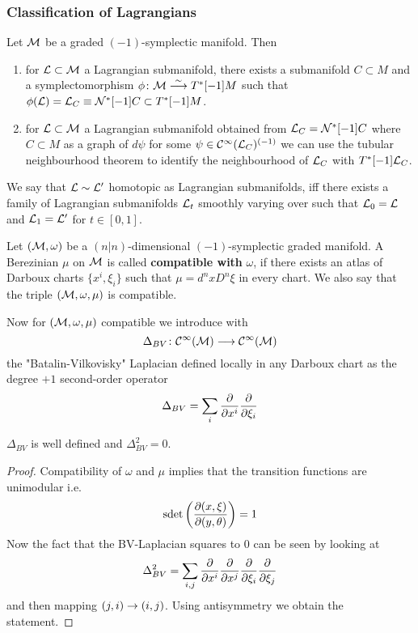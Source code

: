 \subsubsection{Classification of Lagrangians}

Let $\mathcal{M}$ be a graded $(-1)$-symplectic manifold. Then
\begin{enumerate}\label{Classfication_Lagrangian}
  \item for $\mathcal{L} \subset \mathcal{M}$ a Lagrangian submanifold, there exists a submanifold $C \subset M$ and a symplectomorphism $\phi \colon \MM \atob{\sim} T^*[-1]M$ such that $\phi(\LL) = \LL_C \equiv \NC^*[-1] C \subset T^*[-1]M$.

  \item for $\mathcal{L} \subset \mathcal{M}$ a Lagrangian submanifold obtained from $\mathcal{L}_C = \mathcal{N}^*[-1] C$ where $C \subset M$ as a graph of $d\psi$ for some $\psi \in \mathcal{C}^{\infty}(\mathcal{L}_C)^{(-1)}$ we can use the tubular neighbourhood theorem to identify the neighbourhood of $\mathcal{L}_C$ with $T^*[-1]\mathcal{L}_C$.
\end{enumerate}

We say that $\mathcal{L} \sim \mathcal{L}^\prime$ homotopic as Lagrangian submanifolds, iff there exists a family of Lagrangian submanifolds $\mathcal{L}_t$ smoothly varying over  such that $\mathcal{L}_0 = \mathcal{L}$ and $\mathcal{L}_1 = \mathcal{L}^\prime$ for $t \in [0,1]$.

\begin{definition}
  Let $(\mathcal{M}, \omega)$ be a $(n|n)$-dimensional $(-1)$-symplectic graded manifold. A Berezinian $\mu$ on $\mathcal{M}$ is called \textbf{compatible with} $\omega$, if there exists an atlas of Darboux charts $\{ x^i, \xi_i\}$ such that $\mu = d^nx D^n \xi$ in every chart. We also say that the triple $(\mathcal{M}, \omega, \mu)$ is compatible.
\end{definition}

Now for $(\mathcal{M}, \omega, \mu)$ compatible we introduce with
\begin{equation}
  \Delta_{BV} \colon \mathcal{C}^{\infty}(\mathcal{M}) \longrightarrow \mathcal{C}^{\infty}(\mathcal{M})
\end{equation}
the "Batalin-Vilkovisky" Laplacian defined locally in any Darboux chart as the degree $+1$ second-order operator
\begin{equation}
  \Delta_{BV} = \sum_i \frac{\partial }{\partial x^i} \frac{\partial }{\partial \xi_i}
\end{equation}

\begin{lem}
  $\Delta_{BV}$ is well defined and $\Delta_{BV}^2 = 0$.
\begin{proof}
  Compatibility of $\omega$ and $\mu$ implies that the transition functions are unimodular i.e.
  \begin{equation}\operatorname{sdet}\left( \frac{\partial (x, \xi)}{\partial (y, \theta)} \right) = 1 \end{equation}
  Now the fact that the BV-Laplacian squares to $0$ can be seen by looking at
  \begin{equation}
    \Delta_{BV}^2 = \sum_{i,j} \frac{\partial }{\partial x^i} \frac{\partial }{\partial x^j} \frac{\partial }{\partial \xi_i} \frac{\partial }{\partial \xi_j}
  \end{equation}
  and then mapping $(j,i) \rightarrow (i,j)$. Using antisymmetry we obtain the statement.
\end{proof}
\end{lem}

